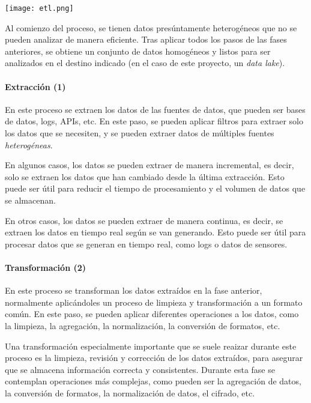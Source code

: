\begin{minipage}{\linewidth}
	\centering
	\texttt{[image: etl.png]}
\end{minipage}

Al comienzo del proceso, se tienen datos presúntamente heterogéneos que no se pueden analizar de
manera eficiente. Tras aplicar todos los pasos de las fases anteriores, se obtiene un conjunto de
datos homogéneos y listos para ser analizados en el destino indicado (en el caso de este proyecto,
un \emph{data lake}).

\paragraph{Extracción (1)}
En este proceso se extraen los datos de las fuentes de datos, que pueden ser bases de datos, logs,
APIs, etc. En este paso, se pueden aplicar filtros para extraer solo los datos que se necesiten, y
se pueden extraer datos de múltiples fuentes \emph{heterogéneas}.

En algunos casos, los datos se pueden extraer de manera incremental, es decir, solo se extraen los
datos que han cambiado desde la última extracción. Esto puede ser útil para reducir el tiempo de
procesamiento y el volumen de datos que se almacenan.

En otros casos, los datos se pueden extraer de manera continua, es decir, se extraen los datos en
tiempo real según se van generando. Esto puede ser útil para procesar datos que se generan en tiempo
real, como logs o datos de sensores.

\newpage{}
\paragraph{Transformación (2)}
En este proceso se transforman los datos extraídos en la fase anterior, normalmente aplicándoles
un proceso de limpieza y transformación a un formato común. En este paso, se pueden aplicar
diferentes operaciones a los datos, como la limpieza, la agregación, la normalización, la conversión
de formatos, etc.

Una transformación especialmente importante que se suele reaizar durante este proceso es la limpieza,
revisión y corrección de los datos extraídos, para asegurar que se almacena información correcta y
consistentes. Durante esta fase se contemplan operaciones más complejas, como pueden ser la agregación
de datos, la conversión de formatos, la normalización de datos, el cifrado, etc.

